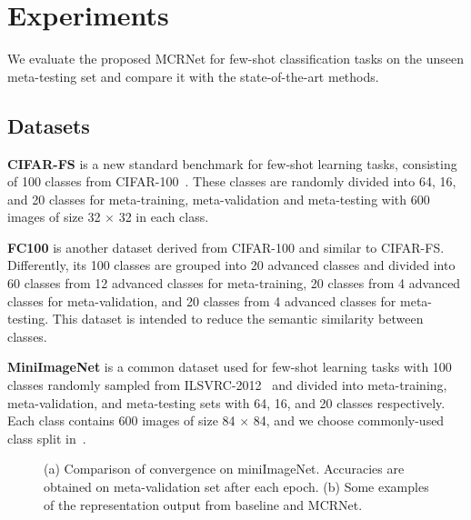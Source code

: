 \documentclass[10pt,conference,a4paper]{IEEEtran}
\begin{document}
\section{Experiments}
We evaluate the proposed MCRNet for few-shot classification tasks on the unseen meta-testing set and compare it with the state-of-the-art methods.

\subsection{Datasets}
\textbf{CIFAR-FS} is a new standard benchmark for few-shot learning tasks, consisting of 100 classes from CIFAR-100~\cite{krizhevsky2010cifar}. These classes are randomly divided into 64, 16, and 20 classes for meta-training, meta-validation and meta-testing with 600 images of size 32 $\times$ 32 in each class.

\textbf{FC100} is another dataset derived from CIFAR-100 and similar to CIFAR-FS. Differently, its 100 classes are grouped into 20 advanced classes and divided into 60 classes from 12 advanced classes for meta-training, 20 classes from 4 advanced classes for meta-validation, and 20 classes from 4 advanced classes for meta-testing. This dataset is intended to reduce the semantic similarity between classes.

\textbf{MiniImageNet} is a common dataset used for few-shot learning tasks with 100 classes randomly sampled from ILSVRC-2012~\cite{russakovsky2015imagenet} and divided into meta-training, meta-validation, and meta-testing sets with 64, 16, and 20 classes respectively. Each class contains 600 images of size 84 $\times$ 84, and we choose commonly-used class split in~\cite{ravi2017optimization}.

\begin{figure*}[htbp]
	\centering
	\caption{(a) Comparison of convergence on miniImageNet. Accuracies are obtained on meta-validation set after each epoch. (b) Some examples of the representation output from baseline and MCRNet.}
	\label{convergence}
\end{figure*}
\end{document}
